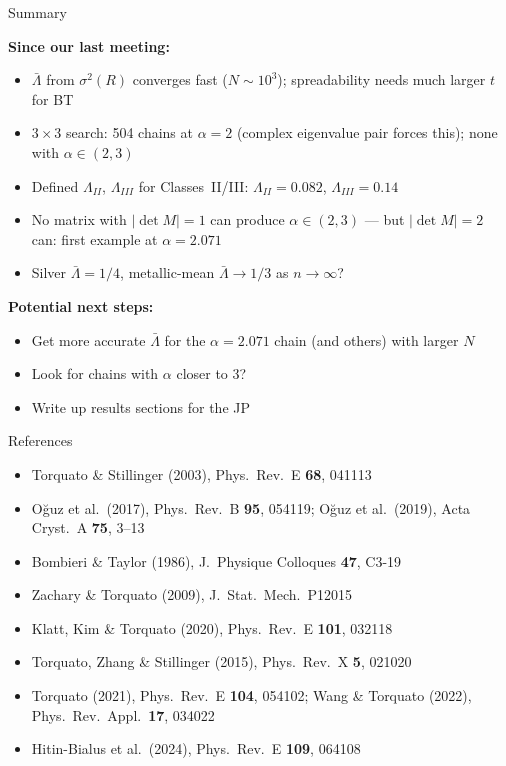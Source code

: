\documentclass[aspectratio=169, 11pt]{beamer}
\begin{document}
\begin{frame}[shrink=7]{Summary}

\textbf{Since our last meeting:}
\begin{itemize}
  \item $\bar\Lambda$ from $\sigma^2(R)$ converges fast ($N\sim10^3$); spreadability needs much larger $t$ for BT
  \item $3\times3$ search: 504 chains at $\alpha{=}2$ (complex eigenvalue pair forces this);
    none with $\alpha\in(2,3)$
  \item Defined $\Lambda_{II}$, $\Lambda_{III}$ for Classes~II/III:
    $\Lambda_{II}{=}0.082$, $\Lambda_{III}{=}0.14$
  \item No matrix with $|\det M|{=}1$ can produce $\alpha\in(2,3)$ ---
    but $|\det M|{=}2$ can: first example at $\alpha{=}2.071$
  \item Silver $\bar\Lambda = 1/4$, metallic-mean $\bar\Lambda \to 1/3$ as $n\to\infty$?
\end{itemize}

\vspace{0.5em}
\textbf{Potential next steps:}
\begin{itemize}
  \item Get more accurate $\bar\Lambda$ for the $\alpha=2.071$ chain (and others) with larger $N$
  \item Look for chains with $\alpha$ closer to 3?
  \item Write up results sections for the JP
\end{itemize}
\end{frame}
\note{
}

\begin{frame}{References}
\small
\begin{itemize}
  \item Torquato \& Stillinger (2003), Phys.\ Rev.\ E \textbf{68}, 041113
  \item O\u{g}uz et al.\ (2017), Phys.\ Rev.\ B \textbf{95}, 054119;\quad
        O\u{g}uz et al.\ (2019), Acta Cryst.\ A \textbf{75}, 3--13
  \item Bombieri \& Taylor (1986), J.\ Physique Colloques \textbf{47}, C3-19
  \item Zachary \& Torquato (2009), J.\ Stat.\ Mech.\ P12015
  \item Klatt, Kim \& Torquato (2020), Phys.\ Rev.\ E \textbf{101}, 032118
  \item Torquato, Zhang \& Stillinger (2015), Phys.\ Rev.\ X \textbf{5}, 021020
  \item Torquato (2021), Phys.\ Rev.\ E \textbf{104}, 054102;\quad
        Wang \& Torquato (2022), Phys.\ Rev.\ Appl.\ \textbf{17}, 034022
  \item Hitin-Bialus et al.\ (2024), Phys.\ Rev.\ E \textbf{109}, 064108
\end{itemize}
\end{frame}
\note{}
\end{document}

